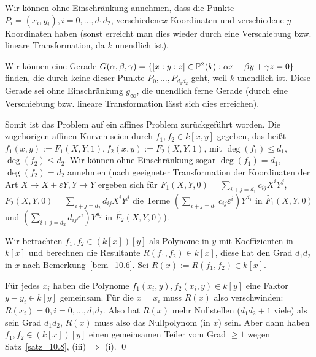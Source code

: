 \begin{bew}[Fortsetzung]
	Wir können ohne Einschränkung annehmen, dass die Punkte $P_i = (x_i,y_i), i=0,\dots,d_1d_2$, verschiedene\linebreak $x$-Koordinaten und verschiedene $y$-Koordinaten haben (sonst erreicht man dies wieder durch eine Verschiebung bzw. lineare Transformation, da $k$ unendlich ist).
\end{bew}

\begin{bew}[Fortsetzung]
	Wir können eine Gerade $G(\alpha,\beta,\gamma) = \{ [x:y:z] \in \mathbb{P}^2(k) : \alpha x + \beta y + \gamma z = 0\}$ finden, die durch keine dieser Punkte $P_0, \dots, P_{d_1d_2}$ geht, weil $k$ unendlich ist. Diese Gerade sei ohne Einschränkung $g_\infty$, die unendlich ferne Gerade (durch eine Verschiebung bzw. lineare Transformation lässt sich dies erreichen).
\end{bew}

\begin{bew}[Fortsetzung]
	Somit ist das Problem auf ein affines Problem zurückgeführt worden. Die zugehörigen affinen Kurven seien durch $f_1,f_2 \in k[x,y]$ gegeben, das heißt $f_1(x,y) := F_1(X,Y,1), f_2(x,y) := F_2(X,Y,1)$, mit $\deg(f_1) \leq d_1$,\linebreak $\deg(f_2) \leq d_2$. Wir können ohne Einschränkung sogar $\deg(f_1) = d_1$, $\deg(f_2) = d_2$ annehmen (nach geeigneter Transformation der Koordinaten der Art $X \rightarrow X + \varepsilon Y, Y \rightarrow Y$ ergeben sich für $F_1(X,Y,0) = \sum_{i+j = d_1} c_{ij} X^i Y^j$,\linebreak $F_2(X,Y,0) = \sum_{i+j = d_2} d_{ij} X^i Y^j$ die Terme $(\sum_{i+j = d_1} c_{ij} \varepsilon^i) Y^{d_1}$ in $\widetilde{F_1}(X,Y,0)$ und $(\sum_{i+j=d_2} d_{ij} \varepsilon^i)Y^{d_2}$ in $\widetilde{F_2}(X,Y,0)$).
\end{bew}

\begin{bew}[Fortsetzung]
	Wir betrachten $f_1,f_2 \in (k[x])[y]$ als Polynome in $y$ mit Koeffizienten in $k[x]$ und berechnen die Resultante $R(f_1,f_2) \in k[x]$, diese hat den Grad $d_1 d_2$ in $x$ nach Bemerkung~\ref{bem_10.6}. Sei $R(x) := R(f_1,f_2) \in k[x]$.
\end{bew}

\begin{bew}[Fortsetzung]
	Für jedes $x_i$ haben die Polynome $f_1(x_i,y), f_2(x_i,y) \in k[y]$ eine Faktor $y-y_i \in k[y]$ gemeinsam. Für die $x = x_i$ muss $R(x)$ also verschwinden: $R(x_i) = 0, i=0, \dots, d_1d_2$. Also hat $R(x)$ mehr Nullstellen ($d_1d_2+1$ viele) als sein Grad $d_1d_2$, $R(x)$ muss also das Nullpolynom (in $x$) sein. Aber dann haben $f_1,f_2 \in (k[x])[y]$ einen gemeinsamen Teiler vom Grad $\geq 1$ wegen Satz~\ref{satz_10.8}, (iii) $\Rightarrow$ (i). \qed
\end{bew}

